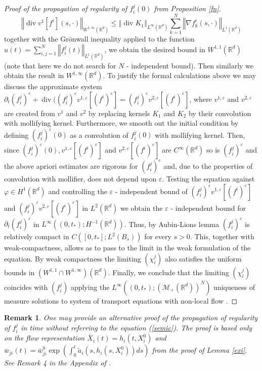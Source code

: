 \documentclass[10pt]{article}
\newtheorem{remark}{Remark}
\def\divv{\operatorname {div}}
\newcommand*{\norm}[1]{\left\Vert{#1}\right\Vert}
\newcommand{\vf}{\varphi}
\newcommand{\ve}{\varepsilon}
\newcommand{\R}{\mathbb{R}}
\newcommand{\xb}{\bar{X}}
\newcommand{\wjib}{\bar{w}_{ji}}
\begin{document}
\begin{proof}[Proof of the propagation of regularity of $f^j_i(0)$ from Proposition \ref{fn}]
\[
\norm{\divv v^1[f^i](s,\cdot)}_{W^{1,\infty}(\R^d)} \leq  \norm{\divv K_1}_{L^{\infty}(\R^d)} \sum_{k=1}^N \norm{\nabla f^i_k(s,\cdot)}_{L^{1}(\R^d)}
\]
together with the Gr\"onwall inequality applied to the function  $u(t)=\sum_{i,j=1}^N\norm{f^j_i(t)}_{L^{1}(\R^d)}$, we obtain the desired bound in $W^{1,1}(\R^d)$ (note that here we do not search for $N$ - independent bound). Then similarly we obtain the result in $W^{1,\infty}(\R^d)$.  To justify the formal  calculations above we may discuss the approximate system $\partial_t (f^j_i)^\ve + \divv ((f_i^j)^\ve v^{1,\ve}[(f^i)^\ve]= (f_i^j)^\ve v^{2,\ve}[(f^i)^\ve]$, where $v^{1,\ve}$ and $v^{2,\ve}$ are created from $v^1$ and $v^2$ by replacing kernels $K_1$ and $K_2$ by their convolution with mollifying kernel. Furthermore, we smooth out the initial condition by defining $(f^j_i)^{\ve}(0)$ as a convolution of $f^j_i(0)$ with mollifying kernel. Then, since $(f^j_i)^{\ve}(0), v^{1,\ve}[(f^i)^\ve]$ and $v^{2,\ve}[(f^i)^\ve]$ are $C^{\infty}(\R^d)$ so is $(f^j_i)^\ve$ and the above apriori estimates are rigorous for $(f^j_i)^\ve$ and, due to the properties of convolution with mollifier, does not depend upon $\ve$. Testing the equation against $\vf \in H^{1}(\R^d)$ and controlling the $\ve$ - independent bound of $(f^j_i)^{\ve}v^{1,\ve}[(f^i)^\ve]$ and $(f^j_i)^{\ve}v^{2,\ve}[(f^i)^\ve]$ in $L^{2}(\R^d)$ we obtain the $\ve$ - independent bound for $\partial_t (f^j_i)^{\ve}$ in $L^{\infty}((0,t_{*});H^{-1}(\R^d))$. Thus, by Aubin-Lions lemma $(f^j_i)^{\ve}$ is relatively compact in $C([0,t_{*}];L^{2}(B_s))$ for every $s>0$. This, together with weak-compactness,  allows as to pass to the limit  in the weak formulation of the equation. By weak compactness the limiting $(\chi_i^j)$ also satisfies the uniform bounds in $(W^{1,1}\cap W^{1,\infty})(\R^d)$. Finally, we conclude that the limiting $(\chi^j_i)$ coincides with  $(f^j_i)$ applying the $L^{\infty}((0,t_{*});(\mathcal{M}_{+}(\R^d))^N)$ uniqueness of measure solutions  to system of transport equations with non-local flow  \cite[Theorem 1.1]{Crippa}.

\end{proof}
\begin{remark}
One may provide an alternative proof of the propagation of regularity of $f^j_i$ in time without referring to the equation (\ref{semic}). The proof is  based only on the flow representation $\xb_i(t) = h_i(t,X_i^0)$ and $\wjib(t)=\wjib^0\exp(\int_0^t\tilde{a}_i(s,h_i(s,X^0_i))ds)$ from the proof of Lemma \ref{exi}. See Remark 4 in the Appendix of \cite{nasza}.
\end{remark}
\end{document}

